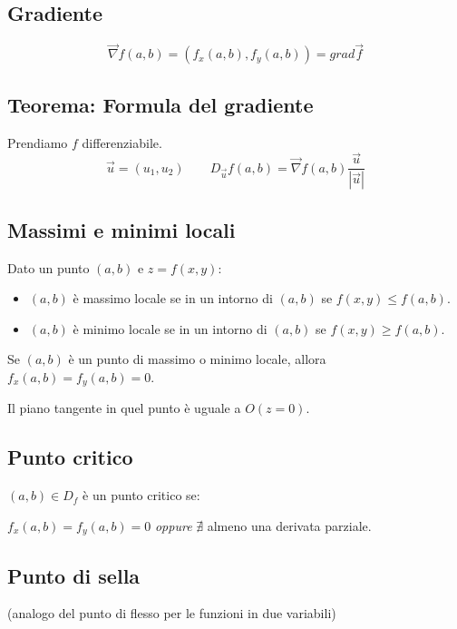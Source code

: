 \documentclass[10pt,a4paper,fleqn]{article}
\begin{document}
	\subsection{Gradiente}

	\begin{equation}
	\vec{\nabla}f(a, b) = (f_x(a, b), f_y(a, b)) = grad \vec{f}
	\end{equation}

	\subsection{Teorema: Formula del gradiente}

	Prendiamo $f$ differenziabile.
	\begin{equation}
	\vec{u}=(u_1, u_2) \qquad D_{\vec{u}} f(a, b) = \vec{\nabla} f(a, b) \frac{\vec{u}}{|\vec{u}|}
	\end{equation}

	\subsection{Massimi e minimi locali}

	Dato un punto $(a, b)$ e $z = f(x, y)$:
	\begin{itemize}
		\item $(a, b)$ è massimo locale se in un intorno di $(a, b)$ se $f(x, y) \leq f(a, b)$.
		\item$(a, b)$ è minimo locale se in un intorno di $(a, b)$ se $f(x, y) \geq f(a, b)$.
	\end{itemize}
	
	Se $(a, b)$ è un punto di massimo o minimo locale, allora $f_x(a, b) = f_y(a, b) = 0$.
	
	Il piano tangente in quel punto è uguale a $O(z=0)$.

	\subsection{Punto critico}

	$(a, b) \in D_f$ è un punto critico se:
	
	$f_x(a, b) = f_y(a, b) = 0$ \qquad \textit{oppure} \qquad
	$\nexists$ almeno una derivata parziale.

	\subsection{Punto di sella} (analogo del punto di flesso per le funzioni in due variabili)
\end{document}
